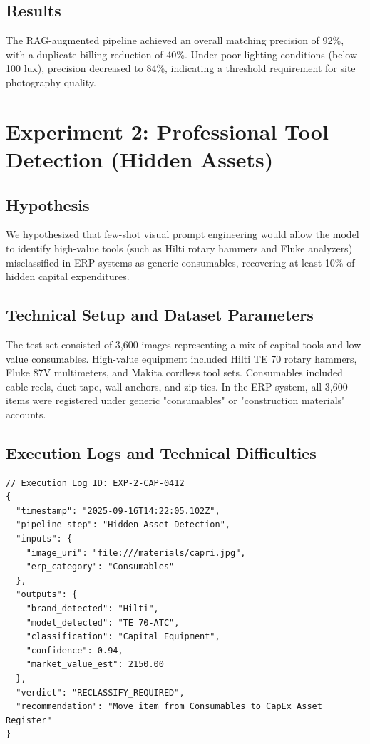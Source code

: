 \documentclass[11pt,letterpaper]{report}
\begin{document}
\subsection{Results}
The RAG-augmented pipeline achieved an overall matching precision of 92\%, with a duplicate billing reduction of 40\%. Under poor lighting conditions (below 100 lux), precision decreased to 84\%, indicating a threshold requirement for site photography quality.

\section{Experiment 2: Professional Tool Detection (Hidden Assets)}

\subsection{Hypothesis}
We hypothesized that few-shot visual prompt engineering would allow the model to identify high-value tools (such as Hilti rotary hammers and Fluke analyzers) misclassified in ERP systems as generic consumables, recovering at least 10\% of hidden capital expenditures.

\subsection{Technical Setup and Dataset Parameters}
The test set consisted of 3,600 images representing a mix of capital tools and low-value consumables. High-value equipment included Hilti TE 70 rotary hammers, Fluke 87V multimeters, and Makita cordless tool sets. Consumables included cable reels, duct tape, wall anchors, and zip ties. In the ERP system, all 3,600 items were registered under generic "consumables" or "construction materials" accounts.

\subsection{Execution Logs and Technical Difficulties}

\begin{listing}[htbp]
\begin{verbatim}
// Execution Log ID: EXP-2-CAP-0412
{
  "timestamp": "2025-09-16T14:22:05.102Z",
  "pipeline_step": "Hidden Asset Detection",
  "inputs": {
    "image_uri": "file:///materials/capri.jpg",
    "erp_category": "Consumables"
  },
  "outputs": {
    "brand_detected": "Hilti",
    "model_detected": "TE 70-ATC",
    "classification": "Capital Equipment",
    "confidence": 0.94,
    "market_value_est": 2150.00
  },
  "verdict": "RECLASSIFY_REQUIRED",
  "recommendation": "Move item from Consumables to CapEx Asset Register"
}
\end{verbatim}
\caption{System execution log detecting a high-value Hilti tool misclassified as a generic consumable.}
\label{lst:log_tool}
\end{listing}
\end{document}
